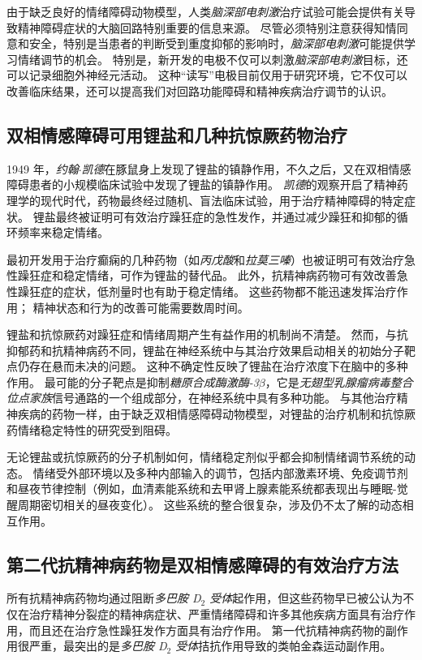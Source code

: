 由于缺乏良好的情绪障碍动物模型，人类\textit{脑深部电刺激}治疗试验可能会提供有关导致精神障碍症状的大脑回路特别重要的信息来源。
尽管必须特别注意获得知情同意和安全，特别是当患者的判断受到重度抑郁的影响时，\textit{脑深部电刺激}可能提供学习情绪调节的机会。
特别是，新开发的电极不仅可以刺激\textit{脑深部电刺激}目标，还可以记录细胞外神经元活动。
这种“读写”电极目前仅用于研究环境，它不仅可以改善临床结果，还可以提高我们对回路功能障碍和精神疾病治疗调节的认识。


\subsection{双相情感障碍可用锂盐和几种抗惊厥药物治疗}

1949 年，\textit{约翰$\cdot$凯德}在豚鼠身上发现了锂盐的镇静作用，不久之后，又在双相情感障碍患者的小规模临床试验中发现了锂盐的镇静作用\cite{cade1949lithium}。
\textit{凯德}的观察开启了精神药理学的现代时代，药物最终经过随机、盲法临床试验，用于治疗精神障碍的特定症状。
锂盐最终被证明可有效治疗躁狂症的急性发作，并通过减少躁狂和抑郁的循环频率来稳定情绪。


最初开发用于治疗癫痫的几种药物（如\textit{丙戊酸}和\textit{拉莫三嗪}）也被证明可有效治疗急性躁狂症和稳定情绪，可作为锂盐的替代品。
此外，抗精神病药物可有效改善急性躁狂症的症状，低剂量时也有助于稳定情绪。
这些药物都不能迅速发挥治疗作用；
精神状态和行为的改善可能需要数周时间。


锂盐和抗惊厥药对躁狂症和情绪周期产生有益作用的机制尚不清楚。
然而，与抗抑郁药和抗精神病药不同，锂盐在神经系统中与其治疗效果启动相关的初始分子靶点仍存在悬而未决的问题。
这种不确定性反映了锂盐在治疗浓度下在脑中的多种作用。
最可能的分子靶点是抑制\textit{糖原合成酶激酶-3$\beta$}，它是\textit{无翅型乳腺瘤病毒整合位点家族}信号通路的一个组成部分，在神经系统中具有多种功能。
与其他治疗精神疾病的药物一样，由于缺乏双相情感障碍动物模型，对锂盐的治疗机制和抗惊厥药情绪稳定特性的研究受到阻碍。


无论锂盐或抗惊厥药的分子机制如何，情绪稳定剂似乎都会抑制情绪调节系统的动态。
情绪受外部环境以及多种内部输入的调节，包括内部激素环境、免疫调节剂和昼夜节律控制（例如，血清素能系统和去甲肾上腺素能系统都表现出与睡眠-觉醒周期密切相关的昼夜变化）。
这些系统的整合很复杂，涉及仍不太了解的动态相互作用。


\subsection{第二代抗精神病药物是双相情感障碍的有效治疗方法}

所有抗精神病药物均通过阻断\textit{多巴胺 D$_2$ 受体}起作用，但这些药物早已被公认为不仅在治疗精神分裂症的精神病症状、严重情绪障碍和许多其他疾病方面具有治疗作用，而且还在治疗急性躁狂发作方面具有治疗作用。
第一代抗精神病药物的副作用很严重，最突出的是\textit{多巴胺 D$_2$ 受体}拮抗作用导致的类帕金森运动副作用。


